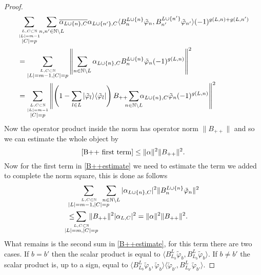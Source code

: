 \documentclass[b5paper,draft,openbib,12pt]{memoir}
\begin{document}
\begin{proof}
\begin{align}\nonumber
&\sum_{\overset{L,C\subset \mathbb{N}}{\overset{|L|=m-1}{|C|=p}}}\hspace{-0.1cm}\sum_{n,n'\in\mathbb{N}\backslash L} \hspace{-0.3cm}\overline{\alpha_{L\cup\{n\},C}}\alpha_{L\cup\{n'\},C} 
 \langle B^{L\cup\{n\}}_n \tilde{\varphi}_{n}, B^{L\cup\{n'\}}_{n'}\tilde{\varphi}_{n'}\rangle (-1)^{g(L,n)+g(L,n')}\\\nonumber
 &=\sum_{\overset{L,C\subset \mathbb{N}}{|L|=m-1,|C|=p}}\left\|\sum_{n\in\mathbb{N}\backslash L}\alpha_{L\cup\{n\},C}  B^{L\cup\{n\}}_n \tilde{\varphi}_{n} (-1)^{g(L,n)} \right\|^2\\\label{B++ first term}
  &=\sum_{\overset{L,C\subset \mathbb{N}}{\overset{|L|=m-1}{|C|=p}}}\left\|\left(1-\sum_{l\in L}|\tilde{\varphi}_l\rangle\langle \tilde{\varphi}_l | \right)B_{++}\hspace{-0.2cm}\sum_{n\in\mathbb{N}\backslash L}\hspace{-0.2cm}\alpha_{L\cup\{n\},C}  \tilde{\varphi}_{n} (-1)^{g(L,n)} \right\|^2
\end{align}
Now the operator product inside the norm has operator norm \(\|B_{++}\|\) and so we can estimate the whole object by
\begin{equation}\label{B++estimatefinal1}
\eqref{B++ first term}\le \|\alpha\|^2 \|B_{++}\|^2.
\end{equation}
Now for the first term in \eqref{B++estimate} we need to estimate the term we added to complete the norm square, this is done as follows
\begin{align}\nonumber
&\sum_{\overset{L,C\subset\mathbb{N}}{|L|=m-1,|C|=p}} \hspace{-0.4cm}\sum_{n\in\mathbb{N}\backslash L} |\alpha_{L\cup\{n\},C}|^2 \|B_n^{L\cup\{n\}} \tilde{\varphi}_{n}\|^2\\\label{B++estimatefinal2}
&\le \hspace{-0.6cm}\sum_{\overset{L,C\subset\mathbb{N}}{|L|=m,|C|=p}}\hspace{-0.5cm} \|B_{++}\|^2|\alpha_{L,C}|^2 =\|\alpha\|^2 \|B_{++}\|^2.
\end{align}
What remains is the second sum in \eqref{B++estimate}, for this term there are two cases.  If \(b=b'\) then the scalar product is 
equal to \(\langle B_{L_b}^L \tilde{\varphi}_b, B_{L_{b}}^L \tilde{\varphi}_{b}\rangle\). If \(b\neq b'\) the scalar product is, up to a sign,
equal to \(\langle B_{L_b}^L \tilde{\varphi}_b,\tilde{\varphi}_{b}\rangle \langle \tilde{\varphi}_{b'}, B_{L_{b'}}^L \tilde{\varphi}_{b'}\rangle\).

\end{proof}
\end{document}
